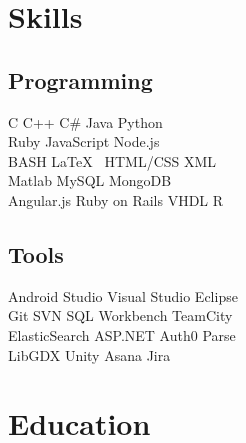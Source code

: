 \documentclass[letterpaper]{deedy-resume}
\begin{document}
\begin{minipage}[t]{0.33\textwidth} %


\section{Skills}

\subsection{Programming}

C \textbullet{} C++ \textbullet{} C\# \textbullet{} Java \textbullet{} Python\\
Ruby \textbullet{} JavaScript \textbullet{} Node.js\\
BASH \textbullet{} \LaTeX\ \textbullet{} HTML/CSS \textbullet{} XML \\

 
Matlab \textbullet{} MySQL \textbullet{} MongoDB \\
Angular.js \textbullet{} Ruby on Rails \textbullet{} VHDL \textbullet{} R \\

\sectionspace %

\subsection{Tools}
Android Studio \textbullet{} Visual Studio \textbullet{} Eclipse \\
Git \textbullet{} SVN \textbullet{} SQL Workbench \textbullet{} TeamCity \\
ElasticSearch \textbullet{} ASP.NET \textbullet{} Auth0 \textbullet{} Parse \\
LibGDX \textbullet{} Unity \textbullet{} Asana \textbullet{} Jira\\

\sectionspace %



\section{Education} 


\end{minipage}
\end{document}
